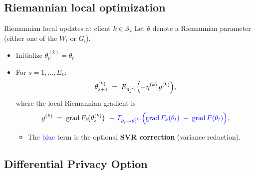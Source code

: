 \documentclass[aspectratio=169,xcolor=dvipsnames]{beamer}
\begin{document}
\subsection{Riemannian local optimization}
\begin{frame}{Riemannian local updates at client $k\in \mathcal{S}_r$}
Let $\theta$ denote a Riemannian parameter (either one of the $W_l$ or $G_l$).  
\begin{itemize} 
\item Initialize $\theta_0^{(k)}=\theta_{t}$
\item For $s=1,\dots, E_k$:
    \[
      \theta_{s+1}^{(k)} \;=\; R_{\theta_{s}^{(k)}}\Bigl(-\eta^{(k)}\, g^{(k)} \Bigr),
    \]
    where the local Riemannian gradient is
    \[
      g^{(k)} \;=\; \text{grad}\, F_k\!\bigl(\theta_s^{(k)}\bigr)
      \;\;\textcolor{blue}{-\;\mathcal{T}_{\,\theta_{t}\to \theta_s^{(k)}}\Bigl(\text{grad}\, F_k(\theta_t)\;-\;\text{grad}\, F(\theta_t)\Bigr)},
    \]
    \begin{itemize}
      \item The \textcolor{blue}{blue} term is the optional \textbf{SVR correction} (variance reduction).
    \end{itemize}
\end{itemize}
\end{frame}

\subsection{Differential Privacy Option}
\end{document}
